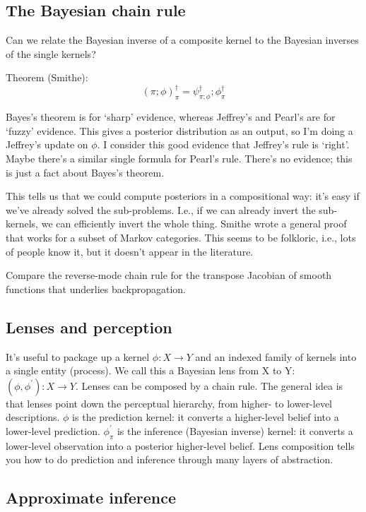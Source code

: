 \subsection*{The Bayesian chain rule}

Can we relate the Bayesian inverse of a composite kernel to the Bayesian inverses of
the single kernels?

Theorem (Smithe):
\begin{equation}
  (\pi; \phi)_\pi^\dagger = \psi_{\pi; \phi}^\dagger; \phi_\pi^\dagger
\end{equation}

Bayes's theorem is for `sharp' evidence, whereas Jeffrey's and Pearl's are for `fuzzy'
evidence.
This gives a posterior distribution as an output, so I'm doing a Jeffrey's update on
$\phi$.
I consider this good evidence that Jeffrey's rule is `right'.
Maybe there's a similar single formula for Pearl's rule.
There's no evidence; this is just a fact about Bayes's theorem.

This tells us that we could compute posteriors in a compositional way: it's easy if
we've already solved the sub-problems.
I.e., if we can already invert the sub-kernels, we can efficiently invert the whole
thing.
Smithe wrote a general proof that works for a subset of Markov categories.
This seems to be folkloric, i.e., lots of people know it, but it doesn't appear in the
literature.

Compare the reverse-mode chain rule for the transpose Jacobian of smooth functions that
underlies backpropagation.

\subsection*{Lenses and perception}

It's useful to package up a kernel $\phi : X \to Y$ and an indexed family of kernels
into a single entity (process).
We call this a Bayesian lens from X to Y: $(\phi, \phi^\prime) : X \to Y$.
Lenses can be composed by a chain rule.
The general idea is that lenses point down the perceptual hierarchy, from higher- to
lower-level descriptions.
$\phi$ is the prediction kernel: it converts a higher-level belief into a lower-level prediction.
$\phi^\prime_\pi$ is the inference (Bayesian inverse) kernel: it converts a lower-level observation into a posterior higher-level belief.
Lens composition tells you how to do prediction and inference through many layers of
abstraction.

\subsection*{Approximate inference}

